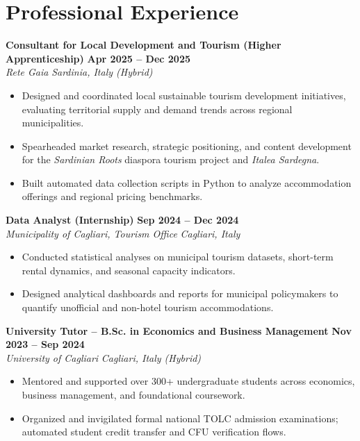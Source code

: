 \documentclass[10pt,a4paper]{article}
\begin{document}
\section{Professional Experience}

\textbf{Consultant for Local Development and Tourism (Higher Apprenticeship)} \hfill \textbf{Apr 2025 -- Dec 2025} \\
\textit{Rete Gaia} \hfill \textit{Sardinia, Italy (Hybrid)}
\begin{itemize}
    \item Designed and coordinated local sustainable tourism development initiatives, evaluating territorial supply and demand trends across regional municipalities.
    \item Spearheaded market research, strategic positioning, and content development for the \textit{Sardinian Roots} diaspora tourism project and \textit{Italea Sardegna}.
    \item Built automated data collection scripts in Python to analyze accommodation offerings and regional pricing benchmarks.
\end{itemize}

\vspace{3pt}
\textbf{Data Analyst (Internship)} \hfill \textbf{Sep 2024 -- Dec 2024} \\
\textit{Municipality of Cagliari, Tourism Office} \hfill \textit{Cagliari, Italy}
\begin{itemize}
    \item Conducted statistical analyses on municipal tourism datasets, short-term rental dynamics, and seasonal capacity indicators.
    \item Designed analytical dashboards and reports for municipal policymakers to quantify unofficial and non-hotel tourism accommodations.
\end{itemize}

\vspace{3pt}
\textbf{University Tutor -- B.Sc. in Economics and Business Management} \hfill \textbf{Nov 2023 -- Sep 2024} \\
\textit{University of Cagliari} \hfill \textit{Cagliari, Italy (Hybrid)}
\begin{itemize}
    \item Mentored and supported over 300+ undergraduate students across economics, business management, and foundational coursework.
    \item Organized and invigilated formal national TOLC admission examinations; automated student credit transfer and CFU verification flows.
\end{itemize}
\end{document}
